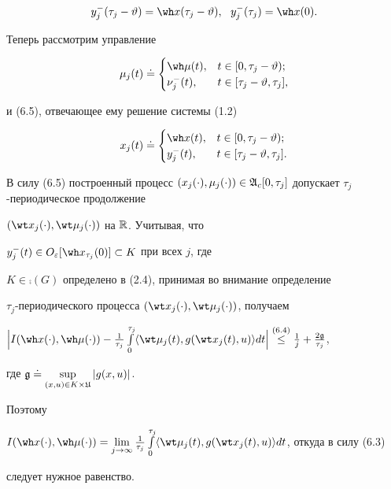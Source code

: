\begin{pf}
\begin{equation}


y_j^-(\tau_j-\vartheta )=


\wh x(\tau_j-\vartheta ),\ \ y_j^-(\tau_j)=\wh x(0).


\end{equation}





Теперь рассмотрим управление


$$


\mu_j(t)\doteq \begin{cases}


\wh\mu(t),& t\in[0,\tau_j-\vartheta );\\


\nu_j^-(t),& t\in[\tau_j-\vartheta ,\tau_j],


\end{cases}


$$


и (6.5), отвечающее ему решение системы (1.2)


$$


x_j(t)\doteq \begin{cases}


\wh x(t),& t\in[0,\tau_j-\vartheta);\\


y_j^-(t),& t\in[\tau_j-\vartheta,\tau_j].


\end{cases}


$$





В силу (6.5) построенный процесс $(x_j(\cdot),\mu_j(\cdot))


\in\frak A_c[0,\tau_j]$ допускает $\tau_j$-периодическое продолжение


$(\wt x_j(\cdot),\wt\mu_j(\cdot))$ на $\Bbb R$. Учитывая, что


$y_j^-(t)


\in O_\varepsilon[\wh x_{\tau_j}(0)]\subset K$ при всех $j$, где


$K\in\comp(G)$ определено в (2.4), принимая во внимание определение


$\tau_j$-периодического процесса $(\wt 


x_j(\cdot),\wt\mu_j(\cdot))$, получаем


$\Big|I(\wh x(\cdot),\wh\mu(\cdot))-\frac{1}{\tau_j}


\int\limits_0^{\tau_j}


\langle\wt\mu_j(t),g(\wt x_j(t),u)\rangle


dt\Big|\up{(6.4)}{\le}\frac{1}{j}+\frac{2\frak{g}}{\tau_j}$,


где $\frak g\doteq\sup\limits_{(x,u)\in K\times\frak U}|g(x,u)|$.


Поэтому


$I(\wh x(\cdot),\wh\mu(\cdot))=\lim\limits_{j\to\infty}


\frac{1}{\tau_j}\int\limits_0^{\tau_j}


\langle\wt\mu_j(t),g(\wt x_j(t),u)\rangle dt$, откуда в силу (6.3)


следует нужное равенство.


\end{pf}
